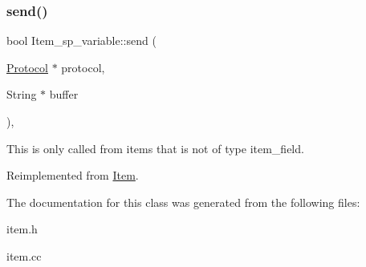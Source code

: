 \mbox{\label{classItem__sp__variable_a0995ce9203747eca85eff9aca948e131}} 
\subsubsection{\texorpdfstring{send()}{send()}}
{\footnotesize\ttfamily bool Item\+\_\+sp\+\_\+variable\+::send (\begin{DoxyParamCaption}\item[{\mbox{\hyperlink{classProtocol}{Protocol}} $\ast$}]{protocol,  }\item[{String $\ast$}]{buffer }\end{DoxyParamCaption})\hspace{0.3cm}{\ttfamily [inline]}, {\ttfamily [virtual]}}

This is only called from items that is not of type item\+\_\+field. 

Reimplemented from \mbox{\hyperlink{classItem_a7d1b934e9612e1c78bd369b31e3d9cb1}{Item}}.



The documentation for this class was generated from the following files\+:\begin{DoxyCompactItemize}
\item 
item.\+h\item 
item.\+cc\end{DoxyCompactItemize}
